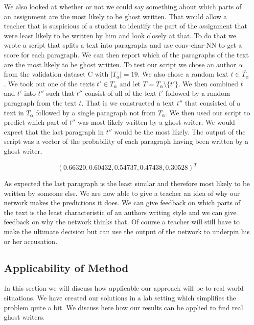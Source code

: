 We also looked at whether or not we could say something about which parts of an
assignment are the most likely to be ghost written. That would allow a teacher
that is suspicious of a student to identify the part of the assignment that were
least likely to be written by him and look closely at that. To do that we wrote
a script that splits a text into paragraphs and use \gls{conv-char-NN} to get a
score for each paragraph. We can then report which of the paragraphs of the text
are the most likely to be ghost written. To test our script we chose an author
$\alpha$ from the validation dataset C with $|T_\alpha| = 19$. We also chose a
random text $t \in \overline{T_\alpha}$. We took out one of the texts $t' \in
T_\alpha$ and let $T = T_\alpha \setminus \{t'\}$. We then combined $t$ and $t'$
into $t''$ such that $t''$ consist of all of the text $t'$ followed by a random
paragraph from the text $t$. That is we constructed a text $t''$ that consisted
of a text in $T_\alpha$ followed by a single paragraph not from $T_\alpha$. We
then used our script to predict which part of $t''$ was most likely written by
a ghost writer. We would expect that the last paragraph in $t''$ would be the
most likely. The output of the script was a vector of the probability of each
paragraph having been written by a ghost writer.

\begin{equation}
    (0.66320, 0.60432, 0.54737, 0.47438, 0.30528)^T
\end{equation}

As expected the last paragraph is the least similar and therefore most likely to
be written by someone else. We are now able to give a teacher an idea of why our
network makes the predictions it does. We can give feedback on which parts of
the text is the least characteristic of an authors writing style and we can give
feedback on why the network thinks that. Of course a teacher will still have to
make the ultimate decision but can use the output of the network to underpin his
or her accusation.


\subsection{Applicability of Method}

In this section we will discuss how applicable our approach will be to real
world situations. We have created our solutions in a lab setting which
simplifies the problem quite a bit. We discuss here how our results can be
applied to find real ghost writers.

